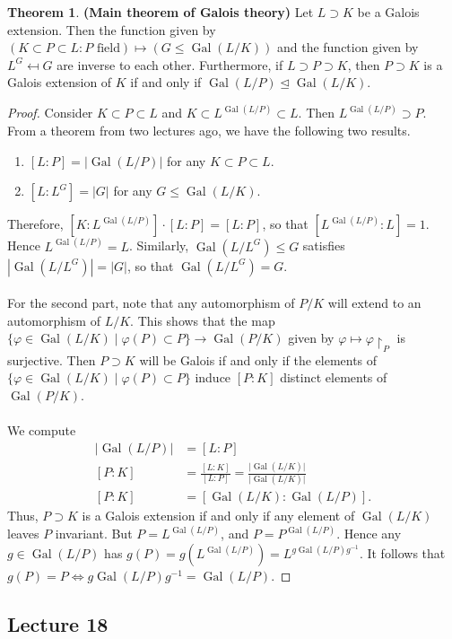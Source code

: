 \documentclass[10pt,letterpaper,cm]{nupset}
\theoremstyle{definition}
\newtheorem{theorem}{Theorem}
\newcommand{\1}{\mathbf{1}}
\newcommand{\0}{\vec 0}
\DeclareMathOperator{\gal}{Gal}
\begin{document}
\begin{theorem}{\textbf{(Main theorem of Galois theory)}}
Let $L \supset K$ be a Galois extension. Then the function given by $(K \subset P \subset L : P \text{ field}) \mapsto (G \leq \gal(L/K))$ and the function given by $L^G \mapsfrom G$ are inverse to each other. Furthermore, if $L \supset P \supset K$, then $P \supset K$ is a Galois extension of $K$ if and only if $\gal(L/P) \unlhd \gal(L/K)$. 
\end{theorem}
\begin{proof}
Consider $K \subset P \subset L$ and $K \subset L^{\gal(L/P)} \subset L$. Then $L^{\gal(L/P)}\supset P$. From a theorem from two lectures ago, we have the following two results.
\begin{enumerate}[label=(\alph*)]
\item $[L:P] = |\gal(L/P)|$ for any $K \subset P \subset L$. 
\item $[L: L^G] = |G|$ for any $G \leq \gal(L/K)$. 
\end{enumerate}
Therefore, $[K: L^{\gal(L/P)}]\cdot [L:P] = [L:P]$, so that $[L^{\gal(L/P)} : L]= 1$. Hence $L^{\gal(L/P)} = L$. Similarly, $\gal(L/L^G) \leq G$ satisfies $|\gal(L/L^G)| = |G|$, so that $\gal(L/L^G) = G$. 
\\ \\
For the second part, note that any automorphism of $P/K$ will extend to an automorphism of $L/K$. This shows that the map $\{\varphi \in \gal(L/K) \mid \varphi(P) \subset P\} \to \gal(P/K)$ given by $\varphi \mapsto \varphi \restriction_P$ is surjective. Then $P \supset K$ will be Galois if and only if the elements of $\{\varphi \in \gal(L/K) \mid \varphi(P) \subset P\}$ induce $[P:K]$ distinct elements of $\gal(P/K)$. 
\\ \\
We compute
\begin{align*}
|\gal(L/P)| & = [L:P]
\\ [P:K] & = \frac{[L:K]}{[L:P]} = \frac{\lvert{\gal(L/K)}\rvert}{\lvert{\gal(L/K)}\rvert}
\\ [P:K] & = [\gal(L/K) : \gal(L/P)].
\end{align*}
Thus, $P \supset K$ is a Galois extension if and only if any element of $\gal(L/K)$ leaves $P$ invariant. But $P = L^{\gal(L/P)}$, and $P = P^{\gal(L/P)}$. Hence any $g \in \gal(L/P)$ has $g(P) = g(L^{\gal(L/P)}) = L^{g\gal(L/P)g^{-1}}$. It follows that $g(P) = P \iff g\gal(L/P)g^{-1} = \gal(L/P)$.
\end{proof}

\subsection{Lecture 18}
\end{document}
